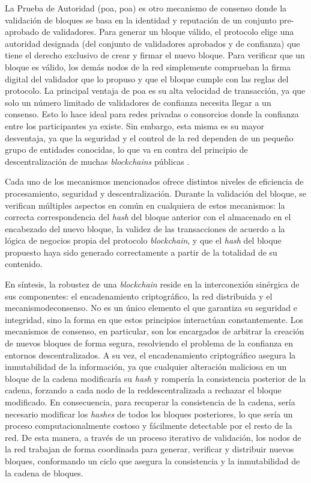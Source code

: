 La Prueba de Autoridad (\acrshort{poa}, \acrlong{poa}) es otro mecanismo de consenso donde la validación de bloques se basa en la identidad y reputación de un conjunto pre-aprobado de validadores. Para generar un bloque válido, el protocolo elige una autoridad designada (del conjunto de validadores aprobados y de confianza) que tiene el derecho exclusivo de crear y firmar el nuevo bloque. Para verificar que un bloque es válido, los demás nodos de la red simplemente comprueban la firma digital del validador que lo propuso y que el bloque cumple con las reglas del protocolo. La principal ventaja de \acrshort{poa} es su alta velocidad de transacción, ya que solo un número limitado de validadores de confianza necesita llegar a un consenso. Esto lo hace ideal para redes privadas o consorcios donde la confianza entre los participantes ya existe. Sin embargo, esta misma es su mayor desventaja, ya que la seguridad y el control de la red dependen de un pequeño grupo de entidades conocidas, lo que va en contra del principio de descentralización de muchas \textit{blockchains} públicas \cite{diaz2022protocolos}.

Cada uno de los mecanismos mencionados ofrece distintos niveles de eficiencia de procesamiento, seguridad y descentralización. Durante la validación del bloque, se verifican múltiples aspectos en común en cualquiera de estos mecanismos: la correcta correspondencia del \textit{hash} del bloque anterior con el almacenado en el encabezado del nuevo bloque, la validez de las transacciones de acuerdo a la lógica de negocios propia del protocolo \textit{blockchain}, y que el \textit{hash} del bloque propuesto haya sido generado correctamente a partir de la totalidad de su contenido.

En síntesis, la robustez de una \textit{blockchain} reside en la interconexión sinérgica de sus componentes: el encadenamiento criptográfico, la red distribuida y el \gls{mecanismodeconsenso}. No es un único elemento el que garantiza su seguridad e integridad, sino la forma en que estos principios interactúan constantemente. Los mecanismos de consenso, en particular, son los encargados de arbitrar la creación de nuevos bloques de forma segura, resolviendo el problema de la confianza en entornos descentralizados. A su vez, el encadenamiento criptográfico asegura la inmutabilidad de la información, ya que cualquier alteración maliciosa en un bloque de la cadena modificaría su \textit{hash} y rompería la consistencia posterior de la cadena, forzando a cada nodo de la \gls{reddescentralizada} a rechazar el bloque modificado. En consecuencia, para recuperar la consistencia de la cadena, sería necesario modificar los \textit{hashes} de todos los bloques posteriores, lo que sería un proceso computacionalmente costoso y fácilmente detectable por el resto de la red. De esta manera, a través de un proceso iterativo de validación, los \glspl{nodo} de la red trabajan de forma coordinada para generar, verificar y distribuir nuevos bloques, conformando un ciclo que asegura la consistencia y la inmutabilidad de la cadena de bloques.

